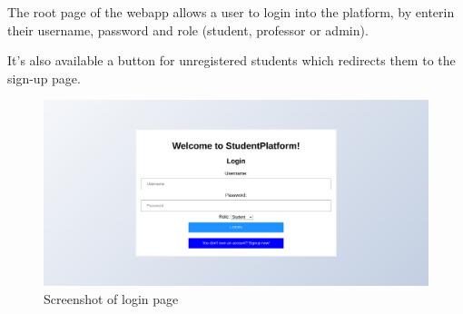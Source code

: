The root page of the webapp allows a user to login into the platform, by enterin their username, password and role (student, professor or admin).

It's also available a button for unregistered students which redirects them to the sign-up page.

\begin{figure}[H]
    \centering
    \includegraphics[width=\textwidth]{img/user_manual/index.png}
    \caption{Screenshot of login page}
\end{figure}
